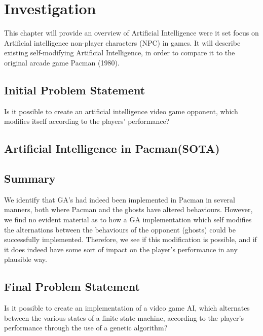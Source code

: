 
\section{Investigation} \label{sec:preanalysus}
This chapter will provide an overview of Artificial Intelligence were it set focus on Artificial intelligence non-player characters (NPC) in games. It will describe existing self-modifying Artificial Intelligence, in order to compare it to the original arcade game Pacman (1980).


\subsection{Initial Problem Statement} \label{sec:initialproblemstatement}
Is it possible to create an artificial intelligence video game opponent, which modifies itself according to the players' performance?



\subsection{Artificial Intelligence in Pacman(SOTA)}



\subsection{Summary}
We identify that GA’s had indeed been implemented in Pacman in several manners, both where Pacman and the ghosts have altered behaviours. However, we find no evident material as to how a GA implementation which self modifies the alternations between the behaviours of the opponent (ghosts) could be successfully implemented. Therefore, we see if this modification is possible, and if it does indeed have some sort of impact on the player’s performance in any plausible way.


\subsection{Final Problem Statement} \label{sec:finalproblemstatement}
Is it possible to create an implementation of a video game AI, which alternates between the various states of a finite state machine, according to the player's performance through the use of a genetic algorithm?